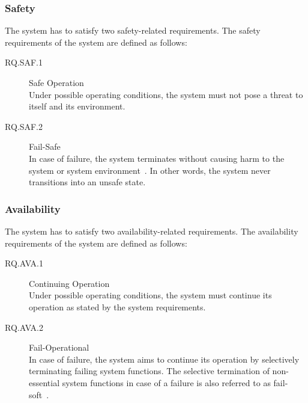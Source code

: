 \subsubsection{Safety}
The system has to satisfy two safety-related requirements.
The safety requirements of the system are defined as follows:
\begin{description}
    \item[RQ.SAF.1] Safe Operation\\
    Under possible operating conditions, the system must not pose a threat to itself and its environment.
    \item[RQ.SAF.2] Fail-Safe\\
    In case of failure, the system terminates without causing harm to the system or system environment~\cite{rfc4949}.
    In other words, the system never transitions into an unsafe state.
\end{description}

\subsubsection{Availability}
The system has to satisfy two availability-related requirements.
The availability requirements of the system are defined as follows:
\begin{description}
    \item[RQ.AVA.1] Continuing Operation\\
    Under possible operating conditions, the system must continue its operation as stated by the system requirements.
    \item[RQ.AVA.2] Fail-Operational\\
    In case of failure, the system aims to continue its operation by selectively terminating failing system functions.
    The selective termination of non-essential system functions in case of a failure is also referred to as fail-soft~\cite{rfc4949}.
\end{description}

